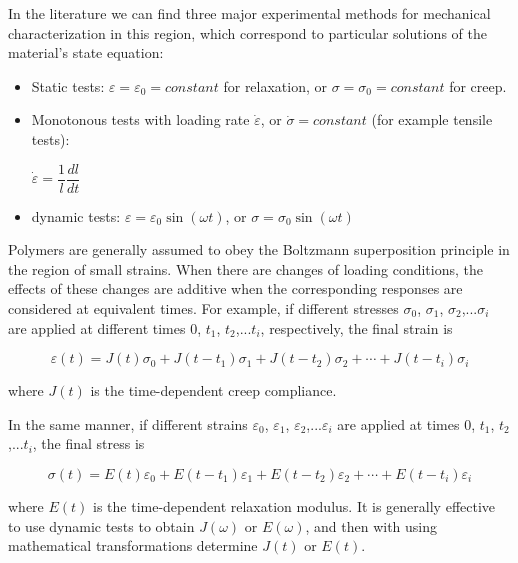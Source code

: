 \begin{itemize}
	In the literature we can find three major experimental methods for mechanical characterization in this region, which correspond to particular solutions of the material's state equation: 
	
	\begin{itemize}
		\item Static tests: $\varepsilon = \varepsilon_{0} = constant$ for relaxation, or $\sigma = \sigma_{0} = constant$ for creep. 
		
		\item Monotonous tests with loading rate $\dot{\varepsilon}$, or $\dot{\sigma} = constant$ (for example tensile tests): 
		
		$\dot{\varepsilon} = \dfrac{1}{l}\dfrac{dl}{dt}$
		
		\item dynamic tests: $\varepsilon = \varepsilon_{0} \sin(\omega t)$, or $\sigma = \sigma_{0} \sin(\omega t)$
	\end{itemize}
	
	Polymers are generally assumed to obey the Boltzmann superposition principle in the region of small strains. When there are changes of loading conditions, the effects of these changes are additive when the corresponding responses are considered at equivalent times. For example, if different stresses $\sigma_{0}$, $\sigma_{1}$, $\sigma_{2}$,...$\sigma_{i}$ are applied at different times $0$, $t_{1}$, $t_{2}$,...$t_{i}$, respectively, the final strain is
	
	\begin{equation}\label{eq2:boltzmann_eps}
		\varepsilon(t) = J(t)\sigma_{0} + J(t-t_{1})\sigma_{1}+J(t-t_{2})\sigma_{2}+\cdots+J(t-t_{i})\sigma_{i}
	\end{equation}
	
	where $J(t)$ is the time-dependent creep compliance.
	
	In the same manner, if different strains $\varepsilon_{0}$, $\varepsilon_{1}$, $\varepsilon_{2}$,...$\varepsilon_{i}$ are applied at times $0$, $t_{1}$, $t_{2}$,...$t_{i}$, the final stress is 
	
	\begin{equation}\label{eq2:boltzmann_sig}
	\sigma(t) = E(t)\varepsilon_{0} + E(t-t_{1})\varepsilon_{1}+ E(t-t_{2})\varepsilon_{2}+\cdots+E(t-t_{i})\varepsilon_{i}
	\end{equation}
	
	where $E(t)$ is the time-dependent relaxation modulus. It is generally effective to use dynamic tests to obtain $J(\omega)$ or $E(\omega)$, and then with using mathematical transformations determine $J(t)$ or $E(t)$.
	

\end{itemize}
